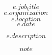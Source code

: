 

\begin{cventries}

  \cventry
    {$$e.job_title$$} %
    {$$e.organization$$} %
    {$$e.location$$} %
    {$$e.date$$} %
    {
		$$e.description$$
      \begin{cvitems} %
        \item{$$note$$}
      \end{cvitems}
	}
\end{cventries}
